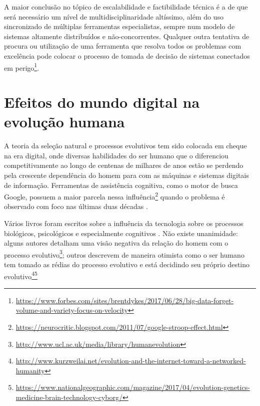 A maior conclusão no tópico de escalabilidade e factibilidade técnica é a de que será necessário um nível de multidisciplinaridade altíssimo, além do uso sincronizado de múltiplas ferramentas especialistas, sempre num modelo de sistemas altamente distribuídos e não-concorrentes. Qualquer outra tentativa de procura ou utilização de uma ferramenta que resolva todos os problemas com excelência pode colocar o processo de tomada de decisão de sistemas conectados em perigo\footnote{\url{https://www.forbes.com/sites/brentdykes/2017/06/28/big-data-forget-volume-and-variety-focus-on-velocity}}.

\section{Efeitos do mundo digital na evolução humana}

A teoria da seleção natural e processos evolutivos tem sido colocada em cheque na era digital, onde diversas habilidades do ser humano que o diferenciou competitivamente ao longo de centenas de milhares de anos estão se perdendo pela crescente dependência do homem para com as máquinas e sistemas digitais de informação. Ferramentas de assistência cognitiva, como o motor de busca Google, possuem a maior parcela nessa influência\footnote{\url{https://neurocritic.blogspot.com/2011/07/google-stroop-effect.html}} quando o problema é observado com foco nas últimas duas décadas \cite{Sparrow2011GoogleEO}. 

Vários livros foram escritos sobre a influência da tecnologia sobre os processos biológicos, psicológicos e especialmente cognitivos \cite{theshallows, theglasscage}. Não existe unanimidade: alguns autores detalham uma visão negativa da relação do homem com o processo evolutivo\footnote{\url{http://www.ucl.ac.uk/media/library/humanevolution}}; outros descrevem de maneira otimista como o ser humano tem tomado as rédias do processo evolutivo e está decidindo seu próprio destino evolutivo\footnote{\url{http://www.kurzweilai.net/evolution-and-the-internet-toward-a-networked-humanity}}\footnote{\url{https://www.nationalgeographic.com/magazine/2017/04/evolution-genetics-medicine-brain-technology-cyborg/}}